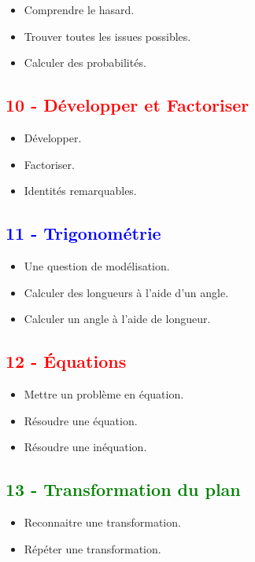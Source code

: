 \documentclass[11pt]{article}
\begin{document}
\begin{multicols}{2}
\begin{itemize}
\item Comprendre le hasard.
\item Trouver toutes les issues possibles.
\item Calculer des probabilités.
\end{itemize}

\subsection*{\textcolor{red}{10 - Développer et Factoriser}}

\begin{itemize}
\item Développer.
\item Factoriser.
\item Identités remarquables.
\end{itemize}

\subsection*{\textcolor{blue}{11 - Trigonométrie}}

\begin{itemize}
\item Une question de modélisation.
\item Calculer des longueurs à l'aide d'un angle.
\item Calculer un angle à l'aide de longueur.
\end{itemize}

\subsection*{\textcolor{red}{12 - Équations}}

\begin{itemize}
\item Mettre un problème en équation.
\item Résoudre une équation.
\item Résoudre une inéquation.
\end{itemize}

\subsection*{\textcolor{green}{13 - Transformation du plan}}

\begin{itemize}
\item Reconnaitre une transformation.
\item Répéter une transformation.
\end{itemize}


\end{multicols}
\end{document}
